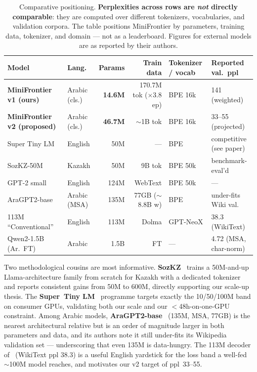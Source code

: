 \documentclass[10pt,twocolumn]{article}
\begin{document}
\begin{table}[t]
\centering
\small
\caption{Comparative positioning. \textbf{Perplexities across rows are
\emph{not} directly comparable}: they are computed over different tokenizers,
vocabularies, and validation corpora. The table positions MiniFrontier by
parameters, training data, tokenizer, and domain --- not as a leaderboard.
Figures for external models are as reported by their authors.}
\label{tab:compare}
\begin{tabular}{@{}llrrll@{}}
\toprule
Model & Lang. & Params & Train data & Tokenizer / vocab & Reported val.\ ppl \\
\midrule
\textbf{MiniFrontier v1 (ours)} & Arabic (cls.) & \textbf{14.6M} & 170.7M tok ($\times$3.8 ep) & BPE 16k & 141 (weighted) \\
\textbf{MiniFrontier v2 (proposed)} & Arabic (cls.) & \textbf{46.7M} & $\sim$1B tok & BPE 16k & 33--55 (projected) \\
\midrule
Super Tiny LM~\cite{stlm}      & English   & 50M   & --- & BPE & competitive (see paper) \\
SozKZ-50M~\cite{sozkz}         & Kazakh    & 50M   & 9B tok & BPE 50k & benchmark-eval'd \\
GPT-2 small~\cite{gpt2}        & English   & 124M  & WebText & BPE 50k & --- \\
AraGPT2-base~\cite{aragpt2}    & Arabic (MSA) & 135M & 77GB ($\sim$8.8B w) & BPE & under-fits Wiki val.\ \\
113M ``Conventional''~\cite{shapeconv} & English & 113M & Dolma & GPT-NeoX & 38.3 (WikiText) \\
Qwen2-1.5B (Ar.\ FT)~\cite{resourceaware} & Arabic & 1.5B & FT & --- & 4.72 (MSA, char-norm) \\
\bottomrule
\end{tabular}
\end{table}

Two methodological cousins are most informative. \textbf{SozKZ}~\cite{sozkz}
trains a 50M-and-up Llama-architecture family from scratch for Kazakh with a
dedicated tokenizer and reports consistent gains from 50M to 600M, directly
supporting our scale-up thesis. The \textbf{Super~Tiny LM}~\cite{stlm} programme
targets exactly the 10/50/100M band on consumer GPUs, validating both our scale
and our $<$48h-on-one-GPU constraint. Among Arabic models,
\textbf{AraGPT2-base}~\cite{aragpt2} (135M, MSA, 77GB) is the nearest
architectural relative but is an order of magnitude larger in both parameters and
data, and its authors note it still under-fits its Wikipedia validation set ---
underscoring that even 135M is data-hungry. The 113M decoder
of~\cite{shapeconv} (WikiText ppl 38.3) is a useful English yardstick for the
loss band a well-fed $\sim$100M model reaches, and motivates our v2 target of
ppl~33--55.
\end{document}
